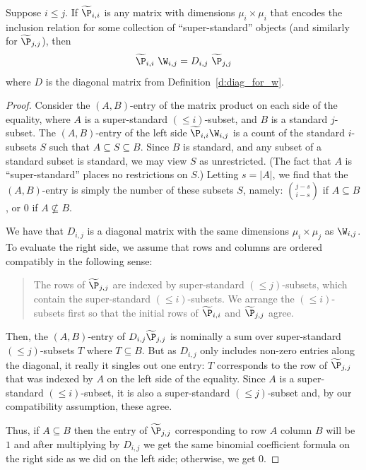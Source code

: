 \begin{lemma}\label{l:simpler}
Suppose $i \leq j$.  If $\widetilde\P_{i,i}$ is any matrix with dimensions $\mu_i \times \mu_i$ that encodes the inclusion relation for some collection of ``super-standard'' objects (and similarly for $\widetilde\P_{j,j}$), then
\[ \widetilde\P_{i,i} \ \W_{i,j} =  D_{i,j} \ \widetilde\P_{j,j} \]
where $D$ is the diagonal matrix from Definition~\ref{d:diag_for_w}.
\end{lemma}
\begin{proof}
Consider the $(A, B)$-entry of the matrix product on each side of the equality, where $A$ is a super-standard $(\leq i)$-subset, and $B$ is a standard $j$-subset.  The $(A, B)$-entry of the left side $\widetilde\P_{i,i} \W_{i,j}$ is a count of the standard $i$-subsets $S$ such that $A \subseteq S \subseteq B$.  Since $B$ is standard, and any subset of a standard subset is standard, we may view $S$ as unrestricted.  (The fact that $A$ is ``super-standard'' places no restrictions on $S$.) Letting $s = |A|$, we find that the $(A,B)$-entry is simply the number of these subsets $S$, namely:  $\binom{j-s}{i-s}$ if $A \subseteq B$, or $0$ if $A \not \subseteq B$.

We have that $D_{i,j}$ is a diagonal matrix with the same dimensions $\mu_i \times \mu_j$ as $\W_{i,j}$.  To evaluate the right side, we assume that rows and columns are ordered compatibly in the following sense: 
\begin{quote}
The rows of $\widetilde\P_{j,j}$ are indexed by super-standard $(\leq j)$-subsets, which contain the super-standard $(\leq i)$-subsets.  We arrange the $(\leq i)$-subsets first so that the initial rows of $\widetilde\P_{i,i}$ and $\widetilde\P_{j,j}$ agree.
\end{quote}
Then, the $(A, B)$-entry of $D_{i,j} \widetilde\P_{j,j}$ is nominally a sum over super-standard $(\leq j)$-subsets $T$ where $T \subseteq B$.  But as $D_{i,j}$ only includes non-zero entries along the diagonal, it really it singles out one entry:  $T$ corresponds to the row of $\widetilde\P_{j,j}$ that was indexed by $A$ on the left side of the equality.  Since $A$ is a super-standard $(\leq i)$-subset, it is also a super-standard $(\leq j)$-subset and, by our compatibility assumption, these agree.

Thus, if $A \subseteq B$ then the entry of $\widetilde\P_{j,j}$ corresponding to row $A$ column $B$ will be $1$ and after multiplying by $D_{i,j}$ we get the same binomial coefficient formula on the right side as we did on the left side; otherwise, we get $0$.
\end{proof}

